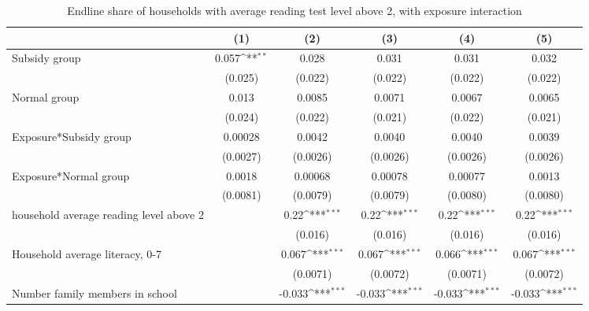 \begin{table}[htbp]\centering
\def\sym#1{\ifmmode^{#1}\else\(^{#1}\)\fi}
\caption{Endline share of households with average reading test level above 2, with exposure interaction}
\begin{tabular*}{1\hsize}{@{\hskip\tabcolsep\extracolsep\fill}l*{5}{c}}
\toprule
                &\multicolumn{1}{c}{(1)}         &\multicolumn{1}{c}{(2)}         &\multicolumn{1}{c}{(3)}         &\multicolumn{1}{c}{(4)}         &\multicolumn{1}{c}{(5)}         \\
\midrule
Subsidy group   &    0.057\sym{**} &    0.028         &    0.031         &    0.031         &    0.032         \\
                &  (0.025)         &  (0.022)         &  (0.022)         &  (0.022)         &  (0.022)         \\
Normal group    &    0.013         &   0.0085         &   0.0071         &   0.0067         &   0.0065         \\
                &  (0.024)         &  (0.022)         &  (0.021)         &  (0.022)         &  (0.021)         \\
Exposure*Subsidy group&  0.00028         &   0.0042         &   0.0040         &   0.0040         &   0.0039         \\
                & (0.0027)         & (0.0026)         & (0.0026)         & (0.0026)         & (0.0026)         \\
Exposure*Normal group&   0.0018         &  0.00068         &  0.00078         &  0.00077         &   0.0013         \\
                & (0.0081)         & (0.0079)         & (0.0079)         & (0.0080)         & (0.0080)         \\
household average reading level above 2&                  &     0.22\sym{***}&     0.22\sym{***}&     0.22\sym{***}&     0.22\sym{***}\\
                &                  &  (0.016)         &  (0.016)         &  (0.016)         &  (0.016)         \\
Household average literacy, 0-7&                  &    0.067\sym{***}&    0.067\sym{***}&    0.066\sym{***}&    0.067\sym{***}\\
                &                  & (0.0071)         & (0.0072)         & (0.0071)         & (0.0072)         \\
Number family members in school&                  &   -0.033\sym{***}&   -0.033\sym{***}&   -0.033\sym{***}&   -0.033\sym{***}\\

\end{tabular*}
\end{table}
